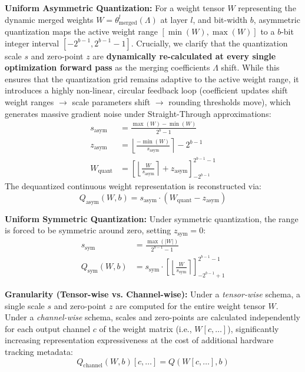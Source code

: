 \textbf{Uniform Asymmetric Quantization:} For a weight tensor $W$ representing the dynamic merged weights $W = \theta^l_{\text{merged}}(\Lambda)$ at layer $l$, and bit-width $b$, asymmetric quantization maps the active weight range $[\min(W), \max(W)]$ to a $b$-bit integer interval $[-2^{b-1}, 2^{b-1}-1]$. Crucially, we clarify that the quantization scale $s$ and zero-point $z$ are \textbf{dynamically re-calculated at every single optimization forward pass} as the merging coefficients $\Lambda$ shift. While this ensures that the quantization grid remains adaptive to the active weight range, it introduces a highly non-linear, circular feedback loop (coefficient updates shift weight ranges $\to$ scale parameters shift $\to$ rounding thresholds move), which generates massive gradient noise under Straight-Through approximations:
\begin{align}
    s_{\text{asym}} &= \frac{\max(W) - \min(W)}{2^b - 1} \\
    z_{\text{asym}} &= \left\lfloor \frac{-\min(W)}{s_{\text{asym}}} \right\rceil - 2^{b-1} \\
    W_{\text{quant}} &= \left[ \left\lfloor \frac{W}{s_{\text{asym}}} \right\rceil + z_{\text{asym}} \right]_{-2^{b-1}}^{2^{b-1}-1}
\end{align}
The dequantized continuous weight representation is reconstructed via:
\begin{equation}
    Q_{\text{asym}}(W, b) = s_{\text{asym}} \cdot (W_{\text{quant}} - z_{\text{asym}})
\end{equation}

\textbf{Uniform Symmetric Quantization:} Under symmetric quantization, the range is forced to be symmetric around zero, setting $z_{\text{sym}} = 0$:
\begin{align}
    s_{\text{sym}} &= \frac{\max(|W|)}{2^{b-1} - 1} \\
    Q_{\text{sym}}(W, b) &= s_{\text{sym}} \cdot \left[ \left\lfloor \frac{W}{s_{\text{sym}}} \right\rceil \right]_{-2^{b-1}+1}^{2^{b-1}-1}
\end{align}

\textbf{Granularity (Tensor-wise vs. Channel-wise):} Under a \emph{tensor-wise} schema, a single scale $s$ and zero-point $z$ are computed for the entire weight tensor $W$. Under a \emph{channel-wise} schema, scales and zero-points are calculated independently for each output channel $c$ of the weight matrix (i.e., $W[c, \dots]$), significantly increasing representation expressiveness at the cost of additional hardware tracking metadata:
\begin{equation}
    Q_{\text{channel}}(W, b)[c, \dots] = Q\left(W[c, \dots], b\right)
\end{equation}

